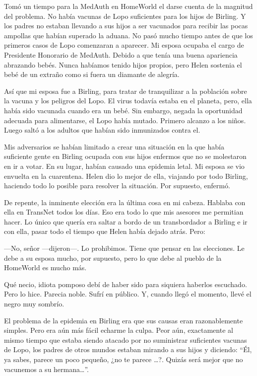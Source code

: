 Tomó un tiempo para la MedAuth en HomeWorld el darse cuenta de la
magnitud del problema. No había vacunas de Lopo suficientes para los
hijos de Birling. Y los padres no estaban llevando a sus hijos a ser
vacunados para recibir las pocas ampollas que habían superado la aduana.
No pasó mucho tiempo antes de que los primeros casos de Lopo comenzaran
a aparecer. Mi esposa ocupaba el cargo de Presidente Honorario de
MedAuth. Debido a que tenía una buena apariencia abrazando bebés. Nunca
habíamos tenido hijos propios, pero Helen sostenia el bebé de un extraño
como si fuera un diamante de alegría.

Así que mi esposa fue a Birling, para tratar de tranquilizar a la
población sobre la vacuna y los peligros del Lopo. El virus todavía
estaba en el planeta, pero, ella había sido vacunada cuando era un bebé.
Sin embargo, negada la oportunidad adecuada para alimentarse, el Lopo
había mutado. Primero alcanzo a los niños. Luego saltó a los adultos que
habían sido inmunizados contra el.

Mis adversarios se habían limitado a crear una situación en la que había
suficiente gente en Birling ocupada con sus hijos enfermos que no se
molestaron en ir a votar. En su lugar, habían causado una epidemia
letal. Mi esposa se vio envuelta en la cuarentena. Helen dio lo mejor de
ella, viajando por todo Birling, haciendo todo lo posible para resolver
la situación. Por supuesto, enfermó.

De repente, la inminente elección era la última cosa en mi cabeza.
Hablaba con ella en TransNet todos los días. Eso era todo lo que mis
asesores me permitian hacer. Lo único que quería era saltar a bordo de
un transbordador a Birling e ir con ella, pasar todo el tiempo que Helen
había dejado atrás. Pero:

---No, señor ---dijeron---. Lo prohibimos. Tiene que pensar en las
elecciones. Le debe a su esposa mucho, por supuesto, pero lo que debe al
pueblo de la HomeWorld es mucho más.

Qué necio, idiota pomposo debí de haber sido para siquiera haberlos
escuchado. Pero lo hice. Parecia noble. Sufrí en público. Y, cuando
llegó el momento, llevé el negro muy sombrío.

El problema de la epidemia en Birling era que sus causas eran
razonablemente simples. Pero era aún más fácil echarme la culpa. Peor
aún, exactamente al mismo tiempo que estaba siendo atacado por no
suministrar suficientes vacunas de Lopo, los padres de otros mundos
estaban mirando a sus hijos y diciendo: ``Él, ya sabes, parece un poco
pequeño, ¿no te parece \ldots{}?. Quizás será mejor que no vacunemos a
su hermana\ldots{}''.

